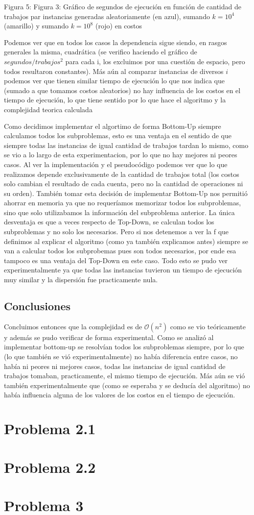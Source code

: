 \documentclass[A4paper,oneside,fleqn,11pt]{article}
\theoremstyle{definition}
\begin{document}
\scriptsize{Figura 5: Figura 3: Gráfico de segundos de ejecución en función de cantidad de trabajos par instancias generadas aleatoriamente (en azul), sumando $k=10^4$ (amarillo) y sumando $k=10^8$ (rojo) en costos}
\normalsize

Podemos ver que en todos los casos la dependencia sigue siendo, en rasgos generales la misma, cuadrática (se verifico haciendo el gráfico de $segundos / trabajos^2$ para cada i, los excluimos por una cuestión de espacio, pero todos resultaron constantes). Más aún al comparar instancias de diversos $i$ podemos ver que tienen similar tiempo de ejecución lo que nos indica que (sumado a que tomamos costos aleatorios) no hay influencia de los costos en el tiempo de ejecución, lo que tiene sentido por lo que hace el algoritmo y la complejidad teorica calculada


Como decidimos implementar el algortimo de forma Bottom-Up siempre calculamos todos los subproblemas, esto es una ventaja en el sentido de que siempre todas las instancias de igual cantidad de trabajos tardan lo mismo, como se vio a lo largo de esta experimentacion, por lo que no hay mejores ni peores casos. Al ver la implementación y el pseudocódigo podemos ver que lo que realizamos depende exclusivamente de la cantidad de trabajos total (los costos solo cambian el resultado de cada cuenta, pero no la cantidad de operaciones ni su orden). También tomar esta decisión de implementar Bottom-Up nos permitió ahorrar en memoria ya que no requeríamos memorizar todos los subproblemas, sino que solo utilizabamos la información del subproblema anterior. La única desventaja es que a veces respecto de Top-Down, se calculan todos los subproblemas y no solo los necesarios. Pero si nos detenemos a ver la f que definimos al explicar el algoritmo (como ya también explicamos antes) siempre se van a calcular todos los subprobemas pues son todos necesarios, por ende esa tampoco es una ventaja del Top-Down en este caso. Todo esto se pudo ver experimentalmente ya que todas las instancias tuvieron un tiempo de ejecución muy similar y la dispersión fue practicamente nula.

\subsection{Conclusiones}

Concluimos entonces que la complejidad es de $\mathcal{O}(n^2)$ como se vio teóricamente y además se pudo verificar de forma experimental. Como se analizó al implementar bottom-up se resolvían todos los subproblemas siempre, por lo que (lo que también se vió experimentalmente) no había diferencia entre casos, no había ni peores ni mejores casos, todas las instancias de igual cantidad de trabajos tomaban, practicamente, el mismo tiempo de ejecución. Más aún se vió también experimentalmente que (como se esperaba y se deducía del algoritmo) no había influencia alguna de los valores de los costos en el tiempo de ejecución.

\section{Problema 2.1}
\section{Problema 2.2}
\section{Problema 3}
\end{document}
